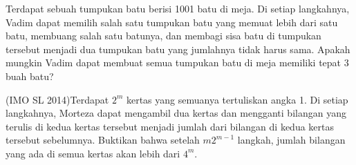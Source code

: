 \documentclass[11pt]{scrartcl}
\begin{document}
\begin{problem}
    Terdapat sebuah tumpukan batu berisi 1001 batu di meja. Di setiap langkahnya, Vadim dapat memilih salah satu tumpukan batu yang memuat lebih dari satu batu, membuang salah satu batunya, dan membagi sisa batu di tumpukan tersebut menjadi dua tumpukan batu yang jumlahnya tidak harus sama. Apakah mungkin Vadim dapat membuat semua tumpukan batu di meja memiliki tepat 3 buah batu?
\end{problem}

\begin{problem}
    (IMO SL 2014)Terdapat $2^m$ kertas yang semuanya tertuliskan angka 1. Di setiap langkahnya, Morteza dapat mengambil dua kertas dan mengganti bilangan yang terulis di kedua kertas tersebut menjadi jumlah dari bilangan di kedua kertas tersebut sebelumnya. Buktikan bahwa setelah $m2^{m - 1}$ langkah, jumlah bilangan yang ada di semua kertas akan lebih dari $4^m$.
\end{problem}
\end{document}
